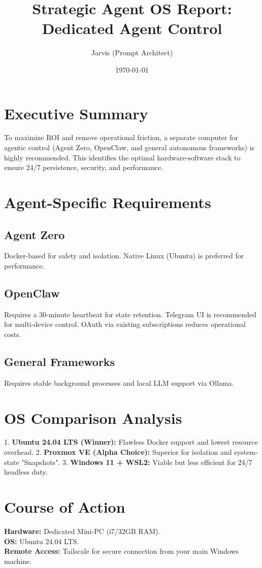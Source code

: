 \documentclass{article}
\begin{document}
\title{Strategic Agent OS Report: Dedicated Agent Control}
\author{Jarvis (Prompt Architect)}
\date{\today}
\maketitle

\section{Executive Summary}
To maximize ROI and remove operational friction, a separate computer for agentic control (Agent Zero, OpenClaw, and general autonomous frameworks) is highly recommended. This identifies the optimal hardware-software stack to ensure 24/7 persistence, security, and performance.

\section{Agent-Specific Requirements}
\subsection{Agent Zero}
Docker-based for safety and isolation. Native Linux (Ubuntu) is preferred for performance.

\subsection{OpenClaw}
Requires a 30-minute heartbeat for state retention. Telegram UI is recommended for multi-device control. OAuth via existing subscriptions reduces operational costs.

\subsection{General Frameworks}
Requires stable background processes and local LLM support via Ollama.

\section{OS Comparison Analysis}
1. \textbf{Ubuntu 24.04 LTS (Winner):} Flawless Docker support and lowest resource overhead.
2. \textbf{Proxmox VE (Alpha Choice):} Superior for isolation and system-state "Snapshots".
3. \textbf{Windows 11 + WSL2:} Viable but less efficient for 24/7 headless duty.

\section{Course of Action}
\textbf{Hardware:} Dedicated Mini-PC (i7/32GB RAM). \\
\textbf{OS:} Ubuntu 24.04 LTS. \\
\textbf{Remote Access:} Tailscale for secure connection from your main Windows machine.
\end{document}
